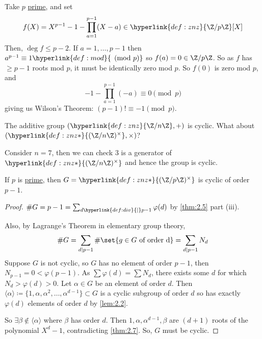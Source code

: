 \documentclass{article}
\begin{document}
\begin{eg}
    Take $p$ \hyperlink{def:prime}{prime}, and set
    \begin{equation*}f(X) = X^{p-1} - 1 - \prod_{a=1}^{p-1} (X - a) \in \hyperlink{def:znz}{\Z / p \Z} [X]\end{equation*}
    Then, $\deg f \leq p-2$. If $a=1, \dotsc, p-1$ then $a^{p-1} \equiv 1 \hyperlink{def:mod}{\pmod{p}}$ so $f(a) = 0 \in \Z/p\Z$.
    So as $f$ has $\geq p-1$ roots mod $p$, it must be identically zero mod $p$. So $f(0)$ is zero mod $p$, and
    \begin{equation*}
        -1 - \prod_{a=1}^{p-1} (-a) \equiv 0 \pmod{p}
    \end{equation*}
    giving us Wilson's Theorem: $(p-1)! \equiv -1 \pmod{p}$.
\end{eg}

The additive group $(\hyperlink{def:znz}{\Z / n\Z}, +)$ is cyclic.
What about $(\hyperlink{def:znz*}{(\Z/n\Z)^\times}, \times)$?

\begin{eg}
    Consider $n=7$, then we can check $3$ is a generator of $\hyperlink{def:znz*}{(\Z / n \Z)^\times}$ and hence the group is cyclic.
\end{eg}

\begin{nthm}\label{thm:2.8}
    If $p$ is \hyperlink{def:prime}{prime}, then $G = \hyperlink{def:znz*}{(\Z / p \Z)^\times}$ is cyclic of order $p-1$.
\end{nthm}

\begin{proof}
    $\# G = p-1 = \sum_{d \hyperlink{def:div}{\mid} p-1} \varphi(d)$ by \cref{thm:2.5} part (iii).

    Also, by Lagrange's Theorem in elementary group theory, \begin{equation*}\# G = \sum_{d \mid p-1} \# \set{g \in G \ \text{of order d}} = \sum_{d \mid p-1} N_d\end{equation*}
    Suppose $G$ is not cyclic, so $G$ has no element of order $p-1$, then ${N_{p-1} = 0 < \varphi(p-1)}$.
    As $\sum \varphi(d) = \sum N_d$, there exists some $d$ for which $N_d > \varphi(d) > 0$. Let $\alpha \in G$ be an element of order $d$.
    Then $\langle\alpha\rangle \coloneqq \{1, \alpha, \alpha^2, \dotsc, \alpha^{d-1}\} \subset G$ is a cyclic subgroup of order $d$ so has exactly $\varphi(d)$ elements of order $d$ by \cref{lem:2.2}.

    So $\exists \beta \notin \langle\alpha\rangle$ where $\beta$ has order $d$.
    Then $1, \alpha, \alpha^{d-1}, \beta$ are $(d+1)$ roots of the polynomial $X^d - 1$, contradicting \cref{thm:2.7}.
    So, $G$ must be cyclic.
\end{proof}
\end{document}
